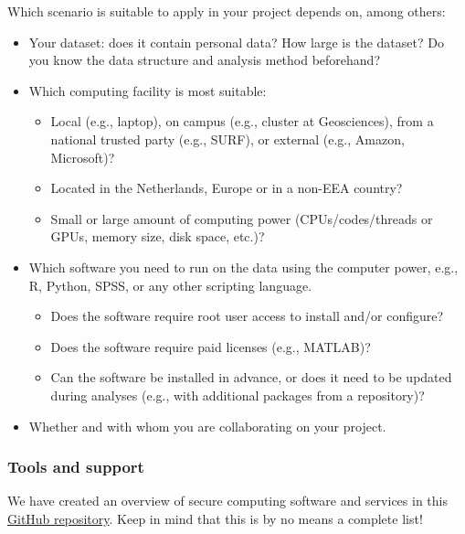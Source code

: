 \documentclass[
]{book}
\providecommand{\tightlist}{%
  \setlength{\itemsep}{0pt}\setlength{\parskip}{0pt}}
\begin{document}
Which scenario is suitable to apply in your project depends on, among others:

\begin{itemize}
\tightlist
\item
  Your dataset: does it contain personal data? How large is the dataset? Do you
  know the data structure and analysis method beforehand?
\item
  Which computing facility is most suitable:

  \begin{itemize}
  \tightlist
  \item
    Local (e.g., laptop), on campus (e.g., cluster at Geosciences), from a
    national trusted party (e.g., SURF), or external (e.g., Amazon, Microsoft)?
  \item
    Located in the Netherlands, Europe or in a non-EEA country?
  \item
    Small or large amount of computing power (CPUs/codes/threads or GPUs, memory
    size, disk space, etc.)?
  \end{itemize}
\item
  Which software you need to run on the data using the computer power, e.g., R,
  Python, SPSS, or any other scripting language.

  \begin{itemize}
  \tightlist
  \item
    Does the software require root user access to install and/or configure?
  \item
    Does the software require paid licenses (e.g., MATLAB)?
  \item
    Can the software be installed in advance, or does it need to be updated
    during analyses (e.g., with additional packages from a repository)?
  \end{itemize}
\item
  Whether and with whom you are collaborating on your project.
\end{itemize}

\hypertarget{computation-support}{%
\subsubsection{Tools and support}\label{computation-support}}

We have created an overview of secure computing software and services in this
\href{https://github.com/UtrechtUniversity/privacy-engineering-tools/blob/main/secure-computing/secure-computing-tools.md}{GitHub repository}.
Keep in mind that this is by no means a complete list!
\end{document}

